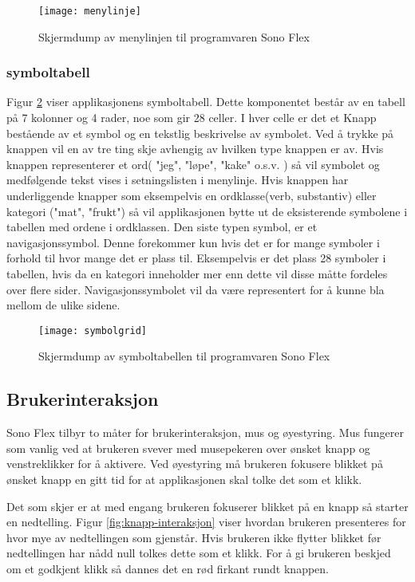 \begin{figure}[ht!]
\centering
\texttt{[image: menylinje]}
\caption{Skjermdump av menylinjen til programvaren Sono Flex}
\label{fig:menylinje}
\end{figure}




\subsubsection{symboltabell}
\label{subsubsec:symboltabell}

Figur \ref{fig:symbolgrid} viser applikasjonens symboltabell. Dette komponentet består av en tabell på 7 kolonner og 4 rader,  noe som gir 28 celler. I hver celle er det et Knapp bestående av et symbol og en tekstlig beskrivelse av symbolet. Ved å trykke på knappen vil en av tre ting skje avhengig av hvilken type knappen er av. Hvis knappen representerer et ord( "jeg",  "løpe",  "kake" o.s.v. ) så vil symbolet og medfølgende tekst vises i setningslisten i menylinje.  Hvis knappen har underliggende knapper som eksempelvis en ordklasse(verb,  substantiv)  eller kategori ("mat",  "frukt") så vil applikasjonen bytte ut de eksisterende symbolene i tabellen med ordene i ordklassen. Den siste typen symbol, er et navigasjonssymbol. Denne forekommer kun hvis det er for mange symboler i forhold til hvor mange det er plass til. Eksempelvis er det plass 28 symboler i tabellen, hvis da en kategori inneholder mer enn dette vil disse måtte fordeles over flere sider. Navigasjonssymbolet vil da være representert for å kunne bla mellom de ulike sidene.


\begin{figure}[ht!]
\centering
\texttt{[image: symbolgrid]}
\caption{Skjermdump av symboltabellen til programvaren Sono Flex}
\label{fig:symbolgrid}
\end{figure}


\subsection{Brukerinteraksjon}

Sono Flex tilbyr to måter for brukerinteraksjon,  mus og øyestyring. Mus fungerer som vanlig ved at brukeren svever med musepekeren over ønsket knapp og venstreklikker for å aktivere. Ved øyestyring må brukeren fokusere blikket på ønsket knapp en gitt tid for at applikasjonen skal tolke det som et klikk. 

Det som skjer er at med engang brukeren fokuserer blikket på en knapp så starter en nedtelling. Figur \ref{fig:knapp-interaksjon} viser hvordan brukeren presenteres for hvor mye av nedtellingen som gjenstår.  Hvis brukeren ikke flytter blikket før nedtellingen har nådd null tolkes dette som et klikk.
For å gi brukeren beskjed om et godkjent klikk så dannes det en rød firkant rundt knappen. 

